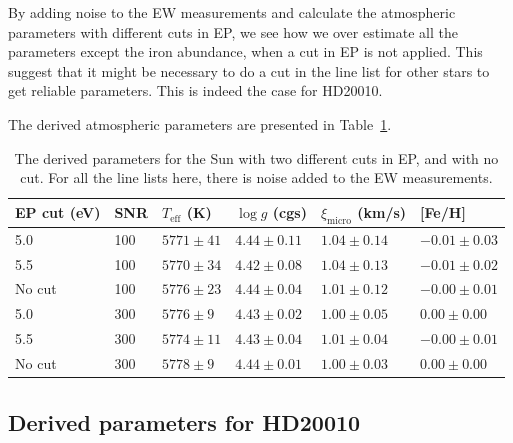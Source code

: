 \documentclass{aa}
\begin{document}
By adding noise to the EW measurements and calculate the atmospheric
parameters with different cuts in EP, we see how we over estimate all
the parameters except the iron abundance, when a cut in EP is not
applied. This suggest that it might be necessary to do a cut in the line
list for other stars to get reliable parameters. This is indeed the case
for HD20010.

The derived atmospheric parameters are presented in Table~\ref{tab:sun}.


\begin{table}[tb!]
    \caption{The derived parameters for the Sun with two different cuts
    in EP, and with no cut. For all the line lists here, there is noise
    added to the EW measurements.}
    \label{tab:sun}
    \centering
    \begin{tabular}{llllll}
      \hline\hline
        EP cut (eV) &  SNR &  $T_\mathrm{eff}$ (K) &  $\log g$ (cgs)     &  $\xi_\mathrm{micro}$ (km/s) &  [Fe/H]           \\
        \hline
        5.0         &  100 &  $5771 \pm  41$       & $4.44   \pm  0.11$  & $1.04  \pm  0.14$            & $-0.01    \pm 0.03$\\
        5.5         &  100 &  $5770 \pm  34$       & $4.42   \pm  0.08$  & $1.04  \pm  0.13$            & $-0.01    \pm 0.02$\\
        No cut      &  100 &  $5776 \pm  23$       & $4.44   \pm  0.04$  & $1.01  \pm  0.12$            & $-0.00    \pm 0.01$\\
        \hline
        5.0         &  300 &  $5776 \pm  9 $       & $4.43   \pm  0.02$  & $1.00  \pm  0.05$            &  $0.00    \pm 0.00$\\
        5.5         &  300 &  $5774 \pm  11$       & $4.43   \pm  0.04$  & $1.01  \pm  0.04$            & $-0.00    \pm 0.01$\\
        No cut      &  300 &  $5778 \pm  9 $       & $4.44   \pm  0.01$  & $1.00  \pm  0.03$            &  $0.00    \pm 0.00$\\
      \hline
    \end{tabular}
\end{table}




\subsection{Derived parameters for HD20010}
\label{sec:derived_parameters_of_hd20010}
\end{document}
